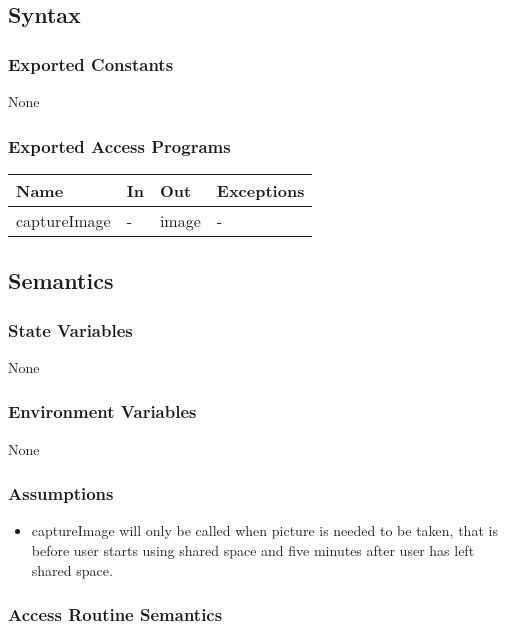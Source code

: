\documentclass[12pt, titlepage]{article}
\begin{document}
\subsection{Syntax}

\subsubsection{Exported Constants}
None

\subsubsection{Exported Access Programs}

\begin{center}
\begin{tabular}{p{4cm} p{4cm} p{4cm} p{3.5cm}}
\hline
\textbf{Name} & \textbf{In} & \textbf{Out} & \textbf{Exceptions} \\
\hline
captureImage & - & image & - \\
\hline
\end{tabular}
\end{center}

\subsection{Semantics}

\subsubsection{State Variables}
None

\subsubsection{Environment Variables}
None

\subsubsection{Assumptions}
\begin{itemize}
\item captureImage will only be called when picture is needed to be taken, that is before user starts using shared space and five minutes after user has left shared space.
\end{itemize}


\subsubsection{Access Routine Semantics}
\end{document}
